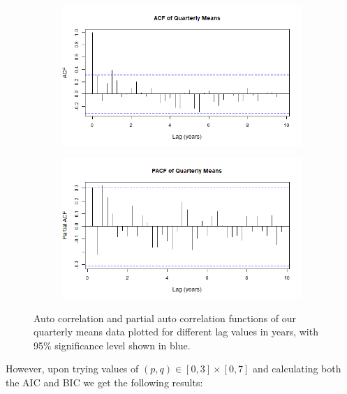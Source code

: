 \begin{figure}[H]
    \centering
    \begin{subfigure}[b]{\sOneSize\textwidth}
        \centering
        \includegraphics[width=\textwidth]{Sections/ARIMA/Plots/ACF.png}
        \label{S2fig:ACF}
    \end{subfigure}
    \begin{subfigure}[b]{\sOneSize\textwidth}
        \centering
        \includegraphics[width=\textwidth]{Sections/ARIMA/Plots/PACF.png}
        \label{S2fig:PACF}
    \end{subfigure}
\caption{Auto correlation and partial auto correlation functions of our quarterly means data plotted for different lag values in years, with 95\% significance level shown in blue.}
\label{S2fig:ACFPACF}
\end{figure}

However, upon trying values of $(p,q) \in [0,3]\times[0,7]$ and calculating both the AIC and BIC we get the following results:

